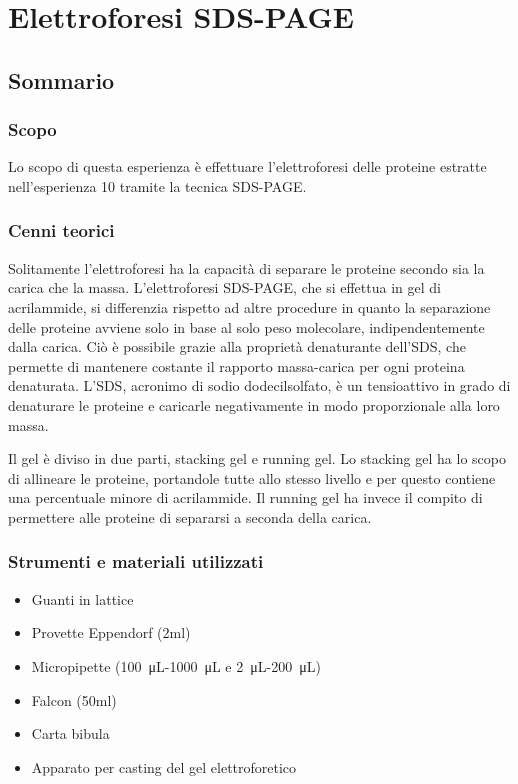 \chapter{Elettroforesi SDS-PAGE}

\vspace{0.6cm}


\section{Sommario}

\subsection{Scopo}

Lo scopo di questa esperienza \`e effettuare l'elettroforesi
delle proteine estratte nell'esperienza 10 tramite la
tecnica SDS-PAGE.

\subsection{Cenni teorici}

Solitamente l'elettroforesi ha la capacit\`a di separare le proteine secondo sia
la carica che la massa.
L'elettroforesi SDS-PAGE, che si effettua in gel di acrilammide, si differenzia
rispetto ad altre procedure in quanto la separazione delle proteine
avviene solo in base al solo peso molecolare, indipendentemente dalla carica.
Ci\`o \`e possibile grazie alla propriet\`a denaturante dell'SDS,
che permette di mantenere costante il rapporto massa-carica per ogni proteina denaturata.
L'SDS, acronimo di sodio dodecilsolfato, \`e un tensioattivo in grado di denaturare le proteine e
caricarle negativamente in modo proporzionale alla loro massa.

Il gel \`e diviso in due parti, stacking gel e running gel. Lo stacking gel
ha lo scopo di allineare le proteine, portandole tutte allo stesso livello e per
questo contiene una percentuale minore di acrilammide.
Il running gel ha invece il compito di permettere alle proteine di separarsi a
seconda della carica.

\subsection{Strumenti e materiali utilizzati}

\begin{itemize}
\item Guanti in lattice
\item Provette Eppendorf (2ml)
\item Micropipette (\SI{100}{\micro\liter}-\SI{1000}{\micro\liter} e \SI{2}{\micro\liter}-\SI{200}{\micro\liter})
\item Falcon (50ml)
\item Carta bibula
\item Apparato per casting del gel elettroforetico
\end{itemize}

